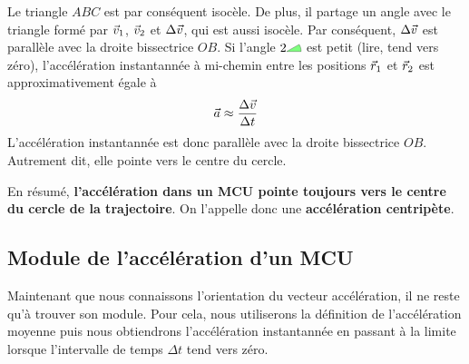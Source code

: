 Le triangle $ABC$ est par conséquent isocèle.  De plus, il partage un angle
avec le triangle formé par $\vec{v}_1$, $\vec{v}_2$ et $\Delta \vec{v}$, qui est aussi
isocèle.  Par conséquent, $\Delta \vec{v}$ est parallèle avec la droite bissectrice
$OB$.  Si l'angle $2\tikz{\filldraw[fill=green, opacity=0.5] (0, 0) -- (0.4, 0)
  arc (0:30:0.4) -- cycle;}$ est petit (lire, tend vers zéro), l'accélération
instantannée à mi-chemin entre les positions $\vec{r}_1$ et $\vec{r}_2$ est
approximativement égale à
\[
  \vec{a} \approx \frac{\Delta \vec{v}}{\Delta t} 
\]
L'accélération instantannée est donc parallèle avec la droite bissectrice $OB$.
Autrement dit, elle pointe vers le centre du cercle.

En résumé, \textbf{l'accélération dans un MCU pointe toujours vers le centre du
cercle de la trajectoire}.  On l'appelle donc une \textbf{accélération
centripète}.



\subsection{Module de l'accélération d'un MCU}

Maintenant que nous connaissons l'orientation du vecteur accélération, il ne reste
qu'à trouver son module.  Pour cela, nous utiliserons la définition de
l'accélération moyenne puis nous obtiendrons l'accélération instantannée en
passant à la limite lorsque l'intervalle de temps $\Delta t$ tend vers zéro.

